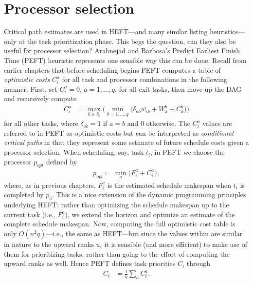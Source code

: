 \documentclass[12pt]{article}
\begin{document}
\section{Processor selection}
\label{sect.processor_selection}

Critical path estimates are used in HEFT---and many similar listing heuristics---only at the task prioritization phase. This begs the question, can they also be useful for processor selection? Arabnejad and Barbosa's Predict Earliest Finish Time (PEFT) heuristic \cite{arabnejad14} represents one sensible way this can be done. Recall from earlier chapters that before scheduling begins PEFT computes a table of {\em optimistic costs} $C_i^a$ for all task and processor combinations in the following manner. First, set $C_i^a = 0$, $a = 1, \dots, q$, for all exit tasks, then move up the DAG and recursively compute 
\begin{align}
C_i^a &= \max_{k \in S_i} \bigg( \min_{b = 1, \dots, q} \big( \delta_{ab}\overline{w_{ik}} + W_k^b + C_k^b \big) \bigg) \label{eq.peft_lookahead}
\end{align} 
for all other tasks, where $\delta_{ab} = 1$ if $a = b$ and $0$ otherwise. The $C_i^a$ values are referred to in PEFT as optimistic costs but can be interpreted as {\em conditional critical paths} in that they represent some estimate of future schedule costs given a processor selection. When scheduling, say, task $t_i$, in PEFT we choose the processor $p_{opt}$ defined by
\begin{align*}
p_{opt} \coloneqq \min_{a} \big( F_i^a + C_i^a \big),
\end{align*}        
where, as in previous chapters, $F_i^a$ is the estimated schedule makespan when $t_i$ is completed by $p_a$. This is a nice extension of the dynamic programming principles underlying HEFT: rather than optimizing the schedule makespan up to the current task (i.e., $F_i^a$), we extend the horizon and optimize an estimate of the complete schedule makespan. Now, computing the full optimistic cost table is only $O(n^2q)$---i.e., the same as HEFT---but since the values within are similar in nature to the upward ranks $u_i$ it is sensible (and more efficient) to make use of them for prioritizing tasks, rather than going to the effort of computing the upward ranks as well. Hence PEFT defines task priorities $C_i$ through
\begin{align}
C_i &= \frac{1}{q} \sum_{a} C_i^a. \label{eq.peft_ranks}
\end{align} 
\end{document}

